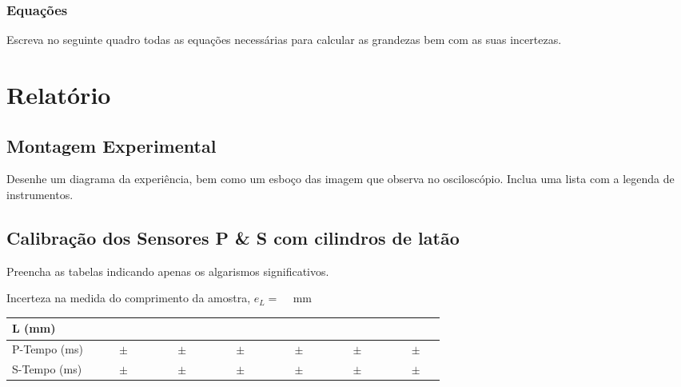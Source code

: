 \documentclass[a4paper,12pt]{article}  %
\begin{document}



\subsubsection{\sf Equações }
Escreva no seguinte quadro todas as equações necessárias para calcular as grandezas bem com as suas incertezas.
\begin{center}
\framebox[15cm]{\rule{0pt}{6.5cm}}
\end{center}


\section{\sf Relatório}
\subsection{\sf Montagem Experimental}
Desenhe um diagrama da experiência, bem como um esboço das imagem que observa no osciloscópio. Inclua uma lista com a legenda de instrumentos.

\begin{center}
\framebox[18cm]{\rule{0pt}{7.5cm}}
\end{center}

\subsection{\sf Calibração dos Sensores P \& S com cilindros de latão}%
Preencha as  tabelas indicando  apenas os algarismos significativos. 

Incerteza na medida do comprimento da amostra, $e_L=$ ~\underline{\makebox[1cm][r]{~}} mm%

\begin{center}
	\begin{tabular}{|l|c|c|c|c|c|c|}
	\hline
	 L (mm)  & & & & & &  \\
	\hline 
	 P-Tempo (ms) & $ \quad \quad \pm \quad $ &$ \quad \quad \pm \quad $ &$ \quad \quad \pm \quad $ &$ \quad \quad \pm \quad $ &$ \quad \quad \pm \quad $ &$ \quad \quad \pm \quad $ \\
\hline
     S-Tempo (ms) & $ \quad \quad \pm \quad $ &$ \quad \quad  \pm \quad $ &$ \quad  \quad \pm \quad $ &$ \quad  \quad \pm \quad $ &$ \quad \quad  \pm \quad $ &$ \quad  \quad \pm \quad $ \\
\hline
				\end{tabular}
\end{center}
\end{document}
